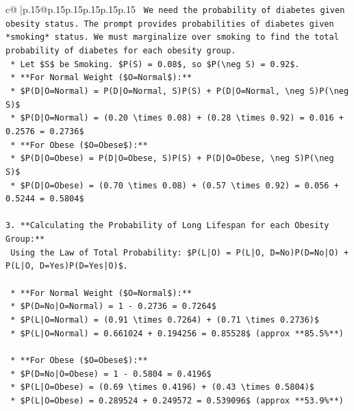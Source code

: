 \documentclass{article}
\begin{document}
{\begin{supertabular}{c@{$\;$}|p{.15\linewidth}@{}p{.15\linewidth}p{.15\linewidth}p{.15\linewidth}p{.15\linewidth}p{.15\linewidth}}
{{{\texttt{    We need the probability of diabetes given obesity status. The prompt provides probabilities of diabetes given *smoking* status. We must marginalize over smoking to find the total probability of diabetes for each obesity group.} \\
\texttt{    *   Let \$S\$ be Smoking. \$P(S) = 0.08\$, so \$P(\textbackslash{}neg S) = 0.92\$.} \\
\texttt{    *   **For Normal Weight (\$O=Normal\$):**} \\
\texttt{        *   \$P(D|O=Normal) = P(D|O=Normal, S)P(S) + P(D|O=Normal, \textbackslash{}neg S)P(\textbackslash{}neg S)\$} \\
\texttt{        *   \$P(D|O=Normal) = (0.20 \textbackslash{}times 0.08) + (0.28 \textbackslash{}times 0.92) = 0.016 + 0.2576 = 0.2736\$} \\
\texttt{    *   **For Obese (\$O=Obese\$):**} \\
\texttt{        *   \$P(D|O=Obese) = P(D|O=Obese, S)P(S) + P(D|O=Obese, \textbackslash{}neg S)P(\textbackslash{}neg S)\$} \\
\texttt{        *   \$P(D|O=Obese) = (0.70 \textbackslash{}times 0.08) + (0.57 \textbackslash{}times 0.92) = 0.056 + 0.5244 = 0.5804\$} \\
\\ 
\texttt{3.  **Calculating the Probability of Long Lifespan for each Obesity Group:**} \\
\texttt{    Using the Law of Total Probability: \$P(L|O) = P(L|O, D=No)P(D=No|O) + P(L|O, D=Yes)P(D=Yes|O)\$.} \\
\\ 
\texttt{    *   **For Normal Weight (\$O=Normal\$):**} \\
\texttt{        *   \$P(D=No|O=Normal) = 1 {-} 0.2736 = 0.7264\$} \\
\texttt{        *   \$P(L|O=Normal) = (0.91 \textbackslash{}times 0.7264) + (0.71 \textbackslash{}times 0.2736)\$} \\
\texttt{        *   \$P(L|O=Normal) = 0.661024 + 0.194256 = 0.85528\$ (approx **85.5\%**)} \\
\\ 
\texttt{    *   **For Obese (\$O=Obese\$):**} \\
\texttt{        *   \$P(D=No|O=Obese) = 1 {-} 0.5804 = 0.4196\$} \\
\texttt{        *   \$P(L|O=Obese) = (0.69 \textbackslash{}times 0.4196) + (0.43 \textbackslash{}times 0.5804)\$} \\
\texttt{        *   \$P(L|O=Obese) = 0.289524 + 0.249572 = 0.539096\$ (approx **53.9\%**)} \\
}}}
\end{supertabular}}
\end{document}
